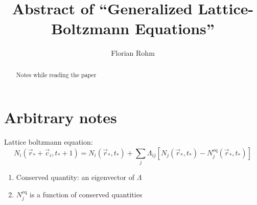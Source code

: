 \documentclass[]{article}
\title{Abstract of ``Generalized Lattice-Boltzmann Equations''}
\author{Florian Rohm}
\begin{document}
\maketitle

\begin{abstract}
Notes while reading the paper
\end{abstract}

\section{Arbitrary notes}

Lattice boltzmann equation:
\[
N_i (\vec{r}_{*} + \vec{c}_i, t_{*} + 1) = N_i (\vec{r}_{*}, t_{*}) + \sum_j \Lambda_{ij} [N_j(\vec{r}_{*}, t_{*}) - N_j^{\text{eq}} (\vec{r}_{*}, t_{*})]
\]
\begin{enumerate}
  \item Conserved quantity: an eigenvector of $\Lambda$
  \item $N_j^{\text{eq}}$ is a function of conserved quantities
\end{enumerate}
\end{document}
